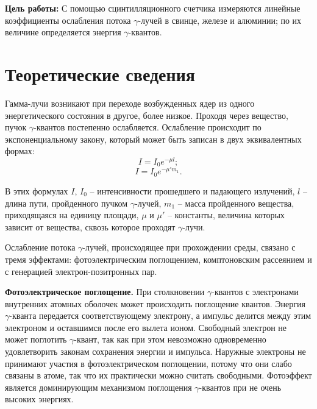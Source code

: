 
\newcommand{\tocsection}[1]{\section*{#1} \addcontentsline{toc}{section}{#1}}
\newcommand{\tocsubsection}[1]{\subsection*{#1} \addcontentsline{toc}{subsection}{#1}}
\renewcommand{\cftsecleader}{\cftdotfill{\cftdotsep}}


	
	\newpage
	
	\tableofcontents
	
	
	
	\newpage
	\textbf{Цель работы:} С помощью сцинтилляционного счетчика измеряются линейные коэффициенты ослабления потока $\gamma$-лучей в свинце, железе и алюминии; по их величине определяется энергия $\gamma$-квантов.

	\tocsection{Теоретические сведения}
	Гамма-лучи возникают при переходе возбужденных ядер из одного энергетического состояния в другое, более низкое. Проходя через вещество, пучок $\gamma$-квантов постепенно ослабляется. Ослабление происходит по экспоненциальному закону, который может быть записан в двух эквивалентных формах:
	\begin{equation}
		I = I_0 e^{-\mu l};
	\end{equation}
	\begin{equation}
		I = I_0 e^{-\mu' m_1}.
	\end{equation}

	В этих формулах $I$, $I_0$ -- интенсивности прошедшего и падающего излучений, $l$ -- длина пути, пройденного пучком $\gamma$-лучей, $m_1$ -- масса пройденного вещества, приходящаяся на единицу площади, $\mu$ и $\mu'$ -- константы, величина которых зависит от вещества, сквозь которое проходят $\gamma$-лучи.
	
	Ослабление потока $\gamma$-лучей, происходящее при прохождении среды, связано с тремя эффектами: фотоэлектрическим поглощением, комптоновским рассеянием и с генерацией электрон-позитронных пар.
	
	
	\textbf{Фотоэлектрическое поглощение.} При столкновении $\gamma$-квантов с электронами внутренних атомных оболочек может происходить поглощение квантов. Энергия $\gamma$-кванта передается соответствующему электрону, а импульс делится между этим электроном и оставшимся после его вылета ионом. Свободный электрон не может поглотить $\gamma$-квант, так как при этом невозможно одновременно удовлетворить законам сохранения энергии и импульса. Наружные электроны не принимают участия в фотоэлектрическом поглощении, потому что они слабо связаны в атоме, так что их практически можно считать свободными. Фотоэффект является доминирующим механизмом поглощения $\gamma$-квантов при не очень высоких энергиях.


